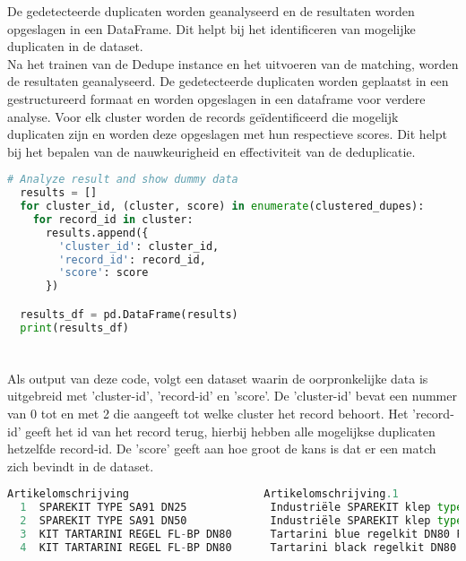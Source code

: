 De gedetecteerde duplicaten worden geanalyseerd en de resultaten worden opgeslagen in een DataFrame. Dit helpt bij het identificeren van mogelijke duplicaten in de dataset. 
\\Na het trainen van de Dedupe instance en het uitvoeren van de matching, worden de resultaten geanalyseerd. De gedetecteerde duplicaten worden geplaatst in een gestructureerd formaat en worden opgeslagen in een dataframe voor verdere analyse. Voor elk cluster worden de records geïdentificeerd  die mogelijk duplicaten zijn en worden deze opgeslagen met hun respectieve scores. Dit helpt bij het bepalen van de nauwkeurigheid en effectiviteit van de deduplicatie.
\begin{lstlisting}[language=Python, caption={Identificeren van mogelijke duplicaten in de dataset}]
  # Analyze result and show dummy data
  results = []
  for cluster_id, (cluster, score) in enumerate(clustered_dupes):
    for record_id in cluster:
      results.append({
        'cluster_id': cluster_id,
        'record_id': record_id,
        'score': score
      })

  results_df = pd.DataFrame(results)
  print(results_df)
\end{lstlisting}

\section{}%
\label{sec:analyseResultatenPOC}

Als output van deze code, volgt een dataset waarin de oorpronkelijke data is uitgebreid met 'cluster-id', 'record-id' en 'score'. De 'cluster-id' bevat een nummer van 0 tot en met 2 die aangeeft tot welke cluster het record behoort. Het 'record-id' geeft het id van het record terug, hierbij hebben alle mogelijkse duplicaten hetzelfde record-id. De 'score' geeft aan hoe groot de kans is dat er een match zich bevindt in de dataset.

\begin{lstlisting}[language=Python, caption={Output dedupe dataframe}]
     Artikelomschrijving		             Artikelomschrijving.1 	                      Voorts.gem.prijs	cluster_id	record_id		score
  1  SPAREKIT TYPE SA91 DN25             Industriële SPAREKIT klep type SA91	DN25    24,99	            1	          255	         0.50913
  2  SPAREKIT TYPE SA91 DN50             Industriële SPAREKIT klep type SA91 DN50	    30,00	            1	          255	         0.50913
  3  KIT TARTARINI REGEL FL-BP DN80      Tartarini blue regelkit DN80 FL-BP           589,00	          2	          726	         0.34925
  4  KIT TARTARINI REGEL FL-BP DN80      Tartarini black regelkit DN80 FL-BP          599,00	          2	          726	         0.34259
\end{lstlisting}

